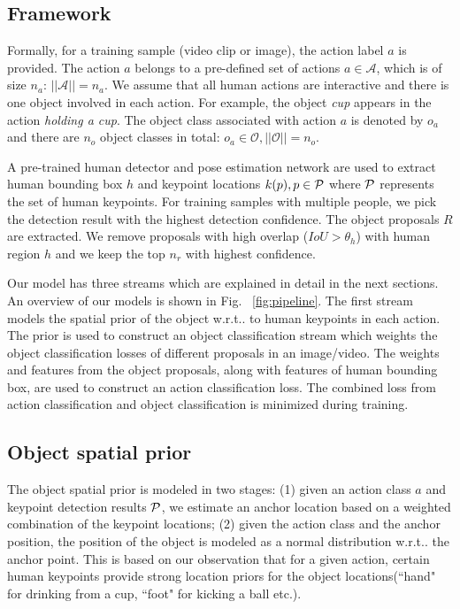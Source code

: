 \documentclass[10pt,twocolumn,letterpaper]{article}
\makeatletter
\newcommand{\scr}[1]{{\mathcal #1}}
\DeclareRobustCommand\onedot{\futurelet\@let@token\@onedot}
\def\onedot{\ifx\@let@token.\else.\null\fi\xspace}
\def\wrt{w.r.t\onedot}
\makeatother
\begin{document}
\vspace{-0.4\baselineskip}
\subsection{Framework}
\vspace{-0.5\baselineskip}

Formally, for a training sample (video clip or image), the action label $a$ is provided. The action $a$ belongs to a pre-defined set of actions $a \in \scr{A}$, which is of size $n_{a}$: $||\scr{A}||=n_{a}$. We assume that all human actions are interactive and there is one object involved in each action. For example, the object \textit{cup} appears in the action \textit{holding a cup}.
The object class associated with action $a$ is denoted by $o_a$ and there are $n_o$ object classes in total: $o_a \in \scr{O}, ||\scr{O}||=n_o$.


A pre-trained human detector \cite{he2017mask} and pose estimation network \cite{wei2016convolutional} are used to extract human bounding box $h$ and keypoint locations $k(p), p \in {\mathcal P}$ where ${\mathcal P}$ represents the set of human keypoints. For training samples with multiple people, we pick the detection result with the highest detection confidence. The object proposals $R$ are extracted. We remove proposals with high overlap ($IoU > \theta_h$) with human region $h$ and we keep the top $n_r$ with highest confidence.

Our model has three streams which are explained in detail in the next sections. An overview of our models is shown in Fig.~
\ref{fig:pipeline}. The first stream models the spatial prior of the object \wrt to human keypoints in each action. The prior is used to construct an object classification stream which weights the object classification losses of different proposals in an image/video. The weights and features from the object proposals, along with features of human bounding box, are used to construct an action classification loss. The combined loss from action classification and object classification is minimized during training.











\vspace{-0.3\baselineskip}
\subsection{Object spatial prior}
\vspace{-0.3\baselineskip}
The object spatial prior is modeled in two stages: (1) given an action class $a$ and keypoint detection results ${\mathcal P}$, we estimate an anchor location based on a weighted combination of the keypoint locations; (2) given the action class and the anchor position, the position of the object is modeled as a normal distribution \wrt the anchor point. This is based on our observation that for a given action, certain human keypoints provide strong location priors for the object locations(``hand" for drinking from a cup, ``foot" for kicking a ball etc.).
\end{document}
